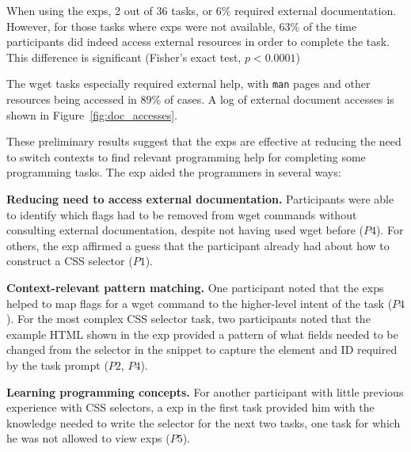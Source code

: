 \begin{changes}
When using the \glspl{exp}, 2 out of 36 tasks, or 6\% required external documentation.
However, for those tasks where \glspl{exp} were not available, 63\% of the time participants did indeed access external resources in order to complete the task.
This difference is significant (Fisher's exact test, $p < 0.0001$)
\end{changes}
The wget tasks especially required external help, with \texttt{man} pages and other resources being accessed in 89\% of cases.  
A log of external document accesses is shown in Figure~\ref{fig:doc_accesses}. 





These preliminary results suggest that the \glspl{exp} are effective at reducing the need to switch contexts to find relevant programming help  for completing some programming tasks. 
The \gls{exp} aided the programmers in several ways:

{\bf Reducing need to access external documentation.}
Participants were  able to identify which flags had to be removed from wget commands without consulting external documentation, despite not having used wget before ($P4$).
For others, the \gls{exp} affirmed a guess that the participant already had about how to construct a CSS selector ($P1$).

{\bf Context-relevant pattern matching.}
One participant noted that the \glspl{exp} helped  to map flags for a wget command to the higher-level intent of the task ($P4$). 
For the most complex CSS selector task, two participants noted
that the example HTML shown in the \gls{exp} 
provided a pattern of what fields needed to be changed  from the selector in the snippet to capture the element and ID required by the task prompt ($P2$, $P4$).

{\bf Learning programming concepts.}
For another participant with little previous experience with CSS selectors, a \gls{exp} in  the first task provided him with the knowledge needed to write the selector for the next two tasks, one task for which he was not allowed to view \glspl{exp} ($P5$).

